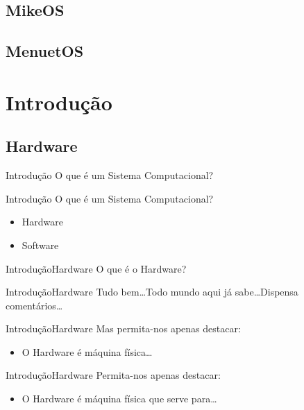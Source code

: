 \documentclass{beamer}
\begin{document}
\subsection{MikeOS}
\subsection{MenuetOS}

\section{Introdução}

\subsection{Hardware}

\begin{frame}{Introdução}
  O que é um Sistema Computacional?
\end{frame}

\begin{frame}{Introdução}
  O que é um Sistema Computacional?
  \begin{itemize}
    \item Hardware
    \item Software
  \end{itemize}
\end{frame}


\begin{frame}{Introdução}{Hardware}
  O que é o Hardware?
\end{frame}

\begin{frame}{Introdução}{Hardware}
  Tudo bem\dots Todo mundo aqui já sabe\dots Dispensa comentários\dots
\end{frame}

\begin{frame}{Introdução}{Hardware}
  Mas permita-nos apenas destacar:
  \begin{itemize}
    \item O Hardware é máquina física\dots
  \end{itemize}
\end{frame}

\begin{frame}{Introdução}{Hardware}
  Permita-nos apenas destacar:
  \begin{itemize}
    \item O Hardware é máquina física que serve para\dots   
  \end{itemize}
\end{frame}
\end{document}
